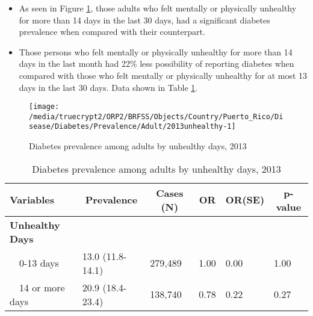 \newpage
\begin{itemize}

\item As seen in Figure \ref{fig:unhlthy.Diabetes.2013}, those adults who felt mentally or physically unhealthy for more than 14 days in the last 30 days, had a significant  
diabetes prevalence when compared with their counterpart.


\item Those persons who felt mentally or physically unhealthy for more than 14 days in the last month had 22\% less possibility of reporting diabetes when compared with those who felt mentally or physically unhealthy for at most 13 days in the last 30 days. Data shown in Table \ref{tab:unhlthy.Diabetes.2013}.

\end{itemize}

\begin{figure}[H]
\caption{Diabetes prevalence among adults by unhealthy days, 2013}
\label{fig:unhlthy.Diabetes.2013}

\begin{knitrout}
\color{fgcolor}

{\centering \texttt{[image: /media/truecrypt2/ORP2/BRFSS/Objects/Country/Puerto\_Rico/Disease/Diabetes/Prevalence/Adult/2013unhealthy-1]} 

}



\end{knitrout}
\end{figure}

\begin{table}[H]
\caption{Diabetes prevalence among adults by unhealthy days, 2013\label{tab:unhlthy.Diabetes.2013}} 
\begin{center}
\begin{tabular}{llllll}
\hline\hline
\multicolumn{1}{l}{Variables}&\multicolumn{1}{c}{Prevalence}&\multicolumn{1}{c}{Cases (N)}&\multicolumn{1}{c}{OR}&\multicolumn{1}{c}{OR(SE)}&\multicolumn{1}{c}{p-value}\tabularnewline
\hline
{\bfseries Unhealthy Days}&&&&&\tabularnewline
~~0-13 days&13.0 (11.8-14.1)&279,489&1.00&0.00&1.00\tabularnewline
~~14 or more days&20.9 (18.4-23.4)&138,740&0.78&0.22&0.27\tabularnewline
\hline
\end{tabular}\end{center}

\end{table}

